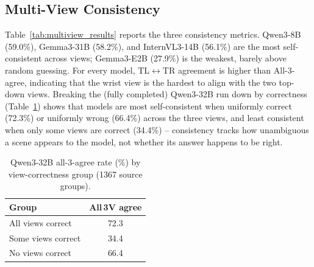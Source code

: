\subsection{Multi-View Consistency}
Table~\ref{tab:multiview_results} reports the three consistency metrics. Qwen3-8B
(59.0\%), Gemma3-31B (58.2\%), and InternVL3-14B (56.1\%) are the most self-consistent
across views; Gemma3-E2B (27.9\%) is the weakest, barely above random guessing. For every model, TL$\leftrightarrow$TR agreement is
higher than All-3-agree, indicating that the wrist view is the hardest to align with the two top-down views. Breaking the (fully completed) Qwen3-32B run down by correctness
(Table~\ref{tab:multiview_correctness}) shows that models are most self-consistent when
uniformly correct (72.3\%) or uniformly wrong (66.4\%) across the three views, and least
consistent when only some views are correct (34.4\%) -- consistency tracks how
unambiguous a scene appears to the model, not whether its answer happens to be right.

\begin{table}[t]
  \centering
  \caption{Qwen3-32B all-3-agree rate (\%) by view-correctness group (1367 source groups).}
  \label{tab:multiview_correctness}
  \begin{tabular}{lc}
    \toprule
    \textbf{Group} & \textbf{All\,3V agree} \\
    \midrule
    All views correct  & 72.3 \\
    Some views correct & 34.4 \\
    No views correct   & 66.4 \\
    \bottomrule
  \end{tabular}
\end{table}

